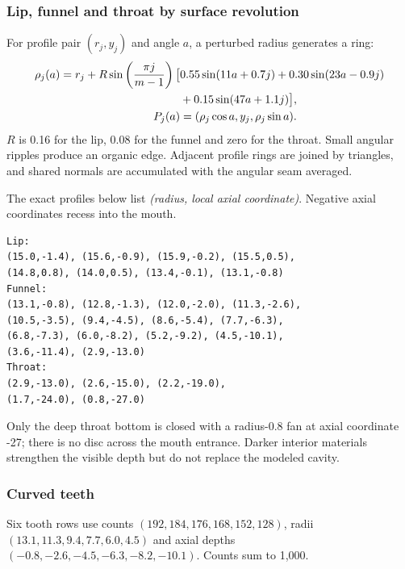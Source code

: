 \subsubsection{Lip, funnel and throat by surface revolution}
For profile pair $(r_j,y_j)$ and angle $a$, a perturbed radius generates a ring:
\begin{align}
\rho_j(a)=r_j+R\sin\left(\frac{\pi j}{m-1}\right)
\big[&0.55\sin(11a+0.7j)+0.30\sin(23a-0.9j)\notag\\
&+0.15\sin(47a+1.1j)\big],\\
P_j(a)&=(\rho_j\cos a,y_j,\rho_j\sin a).
\end{align}
$R$ is 0.16 for the lip, 0.08 for the funnel and zero for the throat. Small angular ripples produce an organic edge. Adjacent profile rings are joined by triangles, and shared normals are accumulated with the angular seam averaged.

The exact profiles below list \emph{(radius, local axial coordinate)}. Negative axial coordinates recess into the mouth.
\begin{lstlisting}
Lip:
(15.0,-1.4), (15.6,-0.9), (15.9,-0.2), (15.5,0.5),
(14.8,0.8), (14.0,0.5), (13.4,-0.1), (13.1,-0.8)
Funnel:
(13.1,-0.8), (12.8,-1.3), (12.0,-2.0), (11.3,-2.6),
(10.5,-3.5), (9.4,-4.5), (8.6,-5.4), (7.7,-6.3),
(6.8,-7.3), (6.0,-8.2), (5.2,-9.2), (4.5,-10.1),
(3.6,-11.4), (2.9,-13.0)
Throat:
(2.9,-13.0), (2.6,-15.0), (2.2,-19.0),
(1.7,-24.0), (0.8,-27.0)
\end{lstlisting}
Only the deep throat bottom is closed with a radius-0.8 fan at axial coordinate -27; there is no disc across the mouth entrance. Darker interior materials strengthen the visible depth but do not replace the modeled cavity.

\subsubsection{Curved teeth}
Six tooth rows use counts $(192,184,176,168,152,128)$, radii $(13.1,11.3,9.4,7.7,6.0,4.5)$ and axial depths $(-0.8,-2.6,-4.5,-6.3,-8.2,-10.1)$. Counts sum to 1,000.

